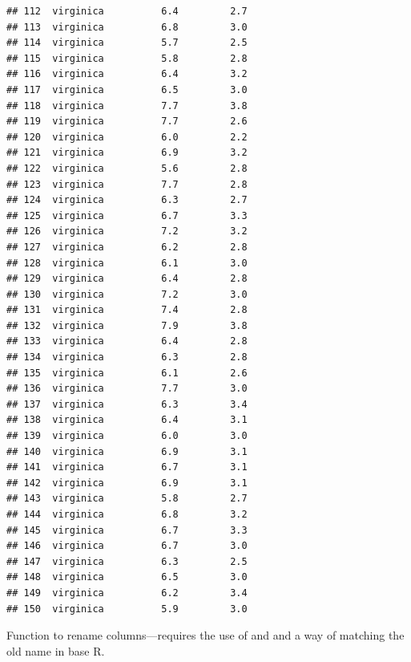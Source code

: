 \documentclass[krantz2]{krantz}\usepackage{knitr}%
\begin{document}
\begin{knitrout}
\begin{kframe}
\begin{verbatim}
## 112  virginica          6.4         2.7
## 113  virginica          6.8         3.0
## 114  virginica          5.7         2.5
## 115  virginica          5.8         2.8
## 116  virginica          6.4         3.2
## 117  virginica          6.5         3.0
## 118  virginica          7.7         3.8
## 119  virginica          7.7         2.6
## 120  virginica          6.0         2.2
## 121  virginica          6.9         3.2
## 122  virginica          5.6         2.8
## 123  virginica          7.7         2.8
## 124  virginica          6.3         2.7
## 125  virginica          6.7         3.3
## 126  virginica          7.2         3.2
## 127  virginica          6.2         2.8
## 128  virginica          6.1         3.0
## 129  virginica          6.4         2.8
## 130  virginica          7.2         3.0
## 131  virginica          7.4         2.8
## 132  virginica          7.9         3.8
## 133  virginica          6.4         2.8
## 134  virginica          6.3         2.8
## 135  virginica          6.1         2.6
## 136  virginica          7.7         3.0
## 137  virginica          6.3         3.4
## 138  virginica          6.4         3.1
## 139  virginica          6.0         3.0
## 140  virginica          6.9         3.1
## 141  virginica          6.7         3.1
## 142  virginica          6.9         3.1
## 143  virginica          5.8         2.7
## 144  virginica          6.8         3.2
## 145  virginica          6.7         3.3
## 146  virginica          6.7         3.0
## 147  virginica          6.3         2.5
## 148  virginica          6.5         3.0
## 149  virginica          6.2         3.4
## 150  virginica          5.9         3.0
\end{verbatim}
\end{kframe}
\end{knitrout}

Function  to rename columns---requires the use of  and  and a way of matching the old name in base R.
\end{document}
